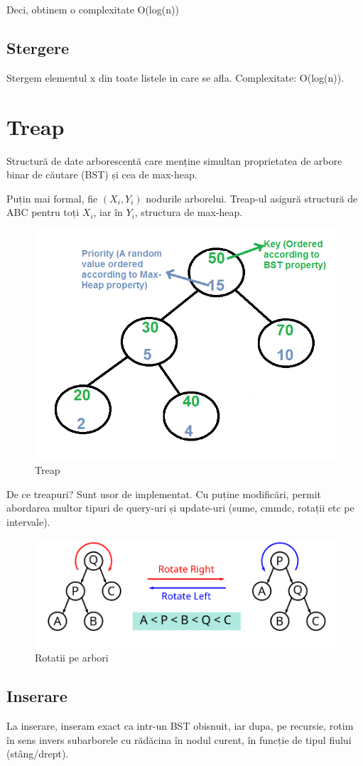 \documentclass[11pt,a4paper]{article}
\theoremstyle{definition}
\theoremstyle{plain}
\theoremstyle{remark}
\begin{document}
Deci, obtinem o complexitate O(log(n))

\subsection*{Stergere}
Stergem elementul x din toate listele in care se afla. Complexitate: O(log(n)).

\section{Treap}
Structură de date arborescentă care menține simultan proprietatea de arbore binar de căutare (BST) și cea de max-heap.

Puțin mai formal, fie $(X_{i}, Y_{i})$ nodurile arborelui. Treap-ul asigură structură de ABC pentru toți $X_i$, iar în $Y_i$, structura de max-heap.

\begin{figure}[H]
    \centering
    \includegraphics[width=0.5\linewidth]{treap1.png}
    \caption{Treap}
    \label{fig:enter-label}
\end{figure}

De ce treapuri? Sunt usor de implementat. Cu puține modificări, permit abordarea multor tipuri de query-uri și update-uri (sume, cmmdc, rotații etc pe intervale).

\begin{figure}[H]
    \centering
    \includegraphics[width=0.5\linewidth]{rotatii1.png}
    \caption{Rotatii pe arbori}
    \label{fig:enter-label}
\end{figure}

\subsection*{Inserare}
La inserare, inseram exact ca intr-un BST obisnuit, iar dupa, pe recursie, rotim în sens invers subarborele cu rădăcina în nodul curent, în funcție de tipul fiului (stâng/drept).
\end{document}
